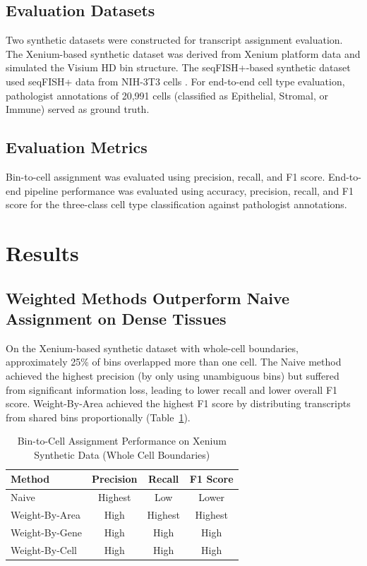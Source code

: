 \documentclass[11pt]{article}
\begin{document}
\subsection{Evaluation Datasets}

Two synthetic datasets were constructed for transcript assignment evaluation. The Xenium-based synthetic dataset was derived from Xenium platform data \citep{he2022highresolution} and simulated the Visium HD bin structure. The seqFISH+-based synthetic dataset used seqFISH+ data from NIH-3T3 cells \citep{shah2016seqfish}. For end-to-end cell type evaluation, pathologist annotations of 20,991 cells (classified as Epithelial, Stromal, or Immune) served as ground truth.

\subsection{Evaluation Metrics}

Bin-to-cell assignment was evaluated using precision, recall, and F1 score. End-to-end pipeline performance was evaluated using accuracy, precision, recall, and F1 score for the three-class cell type classification against pathologist annotations.

\section{Results}

\subsection{Weighted Methods Outperform Naive Assignment on Dense Tissues}

On the Xenium-based synthetic dataset with whole-cell boundaries, approximately 25\% of bins overlapped more than one cell. The Naive method achieved the highest precision (by only using unambiguous bins) but suffered from significant information loss, leading to lower recall and lower overall F1 score. Weight-By-Area achieved the highest F1 score by distributing transcripts from shared bins proportionally (Table~\ref{tab:xenium}).

\begin{table}[ht]
\centering
\caption{Bin-to-Cell Assignment Performance on Xenium Synthetic Data (Whole Cell Boundaries)}
\label{tab:xenium}
\begin{tabular}{lccc}
\toprule
\textbf{Method} & \textbf{Precision} & \textbf{Recall} & \textbf{F1 Score} \\
\midrule
Naive & Highest & Low & Lower \\
Weight-By-Area & High & Highest & Highest \\
Weight-By-Gene & High & High & High \\
Weight-By-Cell & High & High & High \\
\bottomrule
\end{tabular}
\end{table}
\end{document}
